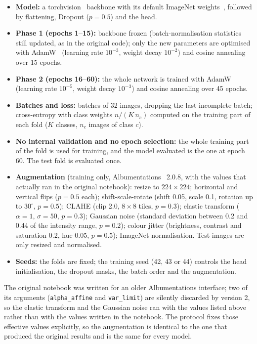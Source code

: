 \begin{itemize}
    \item \textbf{Model:} a torchvision~\cite{paszke2019pytorch} backbone with its default ImageNet weights~\cite{deng2009imagenet}, followed by flattening, Dropout ($p=0.5$) and the head.
    \item \textbf{Phase 1 (epochs 1--15):} backbone frozen (batch-normalisation statistics still updated, as in the original code); only the new parameters are optimised with AdamW~\cite{loshchilov2019adamw} (learning rate $10^{-3}$, weight decay $10^{-2}$) and cosine annealing~\cite{loshchilov2017sgdr} over 15 epochs.
    \item \textbf{Phase 2 (epochs 16--60):} the whole network is trained with AdamW (learning rate $10^{-5}$, weight decay $10^{-3}$) and cosine annealing over 45 epochs.
    \item \textbf{Batches and loss:} batches of 32 images, dropping the last incomplete batch; cross-entropy with class weights $n/(K\,n_c)$ computed on the training part of each fold ($K$ classes, $n_c$ images of class $c$).
    \item \textbf{No internal validation and no epoch selection:} the whole training part of the fold is used for training, and the model evaluated is the one at epoch 60. The test fold is evaluated once.
    \item \textbf{Augmentation} (training only, Albumentations~\cite{buslaev2020albumentations} 2.0.8, with the values that actually ran in the original notebook): resize to $224 \times 224$; horizontal and vertical flips ($p=0.5$ each); shift-scale-rotate (shift 0.05, scale 0.1, rotation up to $30^\circ$, $p=0.5$); CLAHE (clip 2.0, $8 \times 8$ tiles, $p=0.3$); elastic transform ($\alpha=1$, $\sigma=50$, $p=0.3$); Gaussian noise (standard deviation between 0.2 and 0.44 of the intensity range, $p=0.2$); colour jitter (brightness, contrast and saturation 0.2, hue 0.05, $p=0.5$); ImageNet normalisation. Test images are only resized and normalised.
    \item \textbf{Seeds:} the folds are fixed; the training seed (42, 43 or 44) controls the head initialisation, the dropout masks, the batch order and the augmentation.
\end{itemize}

The original notebook was written for an older Albumentations interface; two of its arguments (\texttt{alpha\_affine} and \texttt{var\_limit}) are silently discarded by version 2, so the elastic transform and the Gaussian noise ran with the values listed above rather than with the values written in the notebook. The protocol fixes those effective values explicitly, so the augmentation is identical to the one that produced the original results and is the same for every model.

